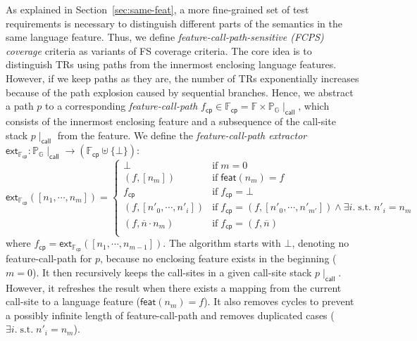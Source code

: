 \documentclass[acmsmall,review,screen]{acmart}
\newcommand{\tif}{\text{if} \; }
\newcommand{\tst}{{\; \text{s.t.} \; }}
\newcommand{\name}[1]{\textsf{#1}}
\newcommand{\graph}{\mathbb{G}}
\newcommand{\node}{n}
\newcommand{\nodes}{\overline{\node}} %
\newcommand{\patset}[1]{\mathbb{P}_{#1}}
\newcommand{\pat}{p}
\newcommand{\featset}{\mathbb{F}}
\newcommand{\feat}{f}
\newcommand{\featmap}{\name{feat}}
\newcommand{\css}[1]{{#1}\!\mid_{\name{call}}}
\newcommand{\fcpset}{\featset_\name{cp}}
\newcommand{\fcp}{\feat_\name{cp}}
\newcommand{\extfcp}{\name{ext}_{\fcpset}}
\begin{document}
As explained in Section~\ref{sec:same-feat}, a more fine-grained set of test
requirements is necessary to distinguish different parts of the semantics
in the same language feature.
Thus, we define \textit{feature-call-path-sensitive (FCPS)
coverage} criteria as variants of FS coverage criteria.
%
The core idea is to distinguish TRs using paths from the innermost enclosing language
features.
%
However, if we keep paths as they are, the number of TRs exponentially increases
because of the path explosion caused by sequential branches.
%
Hence, we abstract a path $\pat$ to a corresponding \textit{feature-call-path}
$\fcp \in \fcpset = \featset \times \css{\patset{\graph}}$, which consists of
the innermost enclosing feature and a subsequence of the call-site stack $\css{\pat}$
from the feature.
%
We define the \textit{feature-call-path extractor} $\extfcp:
\css{\patset{\graph}} \rightarrow (\fcpset \uplus \{ \bot \})$:
%
\begin{equation}\label{equ:extfcp}
  \extfcp([\node_1, \cdots, \node_m]) = \left\{
    \begin{array}{ll}
      \bot & \tif m = 0\\

      (\feat, [\node_m]) & \tif \featmap(\node_m) = \feat\\

      \fcp & \tif \fcp = \bot\\

      (\feat, [\node'_0, \cdots, \node'_i]) &
      \tif \fcp = (\feat, [\node'_0, \cdots, \node'_{m'}]) \wedge
      \exists i. \tst \node'_i = \node_m\\

      (\feat, \nodes \cdot \node_m) & \tif \fcp = (\feat, \nodes)\\
    \end{array}
  \right.
\end{equation}
%
where $\fcp = \extfcp([\node_1, \cdots, \node_{m-1}])$.
%
The algorithm starts with $\bot$, denoting no feature-call-path
for $\pat$, because no enclosing feature exists in the beginning ($m = 0$).
%
It then recursively keeps the call-sites in a given call-site
stack $\css{\pat}$.
%
However, it refreshes the result when there exists a mapping from the current
call-site to a language feature ($\featmap(\node_m) = \feat$).
%
It also removes cycles to prevent a possibly infinite
length of feature-call-path and removes duplicated cases ($\exists i. \tst
\node'_i = \node_m$).

\end{document}
